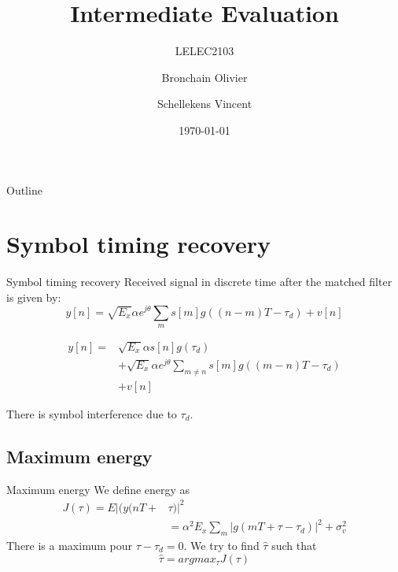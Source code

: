 \documentclass{beamer}
\title{Intermediate Evaluation}
\subtitle{LELEC2103}
\author{Bronchain Olivier \and Schellekens Vincent}
\institute[Ecole Polytechnique de Louvain]{
    Ecole Polytechnique de Louvain} %
\date{\today}
\begin{document}
\begin{frame}
  \titlepage
\end{frame}

\begin{frame}{Outline}
  \tableofcontents
\end{frame}

\section{Symbol timing recovery}
    \begin{frame}{Symbol timing recovery}
    Received signal in discrete time after the matched filter is given by:
    \begin{equation}
        y[n] = \sqrt{E_x}\alpha e^{j\theta}\sum_m s[m]g((n-m)T-\tau_d)+v[n]
    \end{equation}
    
    \begin{equation}
        \begin{split}
        y[n] =  & \sqrt{E_x}\alpha s[n]g(\tau_d) \\ 
                & +  \sqrt{E_x} \alpha e^{j\theta} \sum_{m \neq n} s[m] g((m-n)T-\tau_d) \\
                & + v[n]
        \end{split}
    \end{equation}
    
    There is symbol interference due to $\tau_d$.
    \end{frame}
\subsection{Maximum energy}

    \begin{frame}{Maximum energy}
	We define energy as
	\begin{equation}
		\begin{split}
			J(\tau) = E|(y(nT+&\tau)|^2 \\
				&= \alpha^2 E_x \sum_m |g(mT+\tau-\tau_d)|^2 + \sigma_v ^2
		\end{split}
	\end{equation}  
	There is a maximum pour $\tau - \tau_d = 0$. We try to find $\hat{\tau}$ such that
	\begin{equation}
		\hat{\tau} = argmax_{\tau} J(\tau)
	\end{equation}	
    \end{frame}
\end{document}
